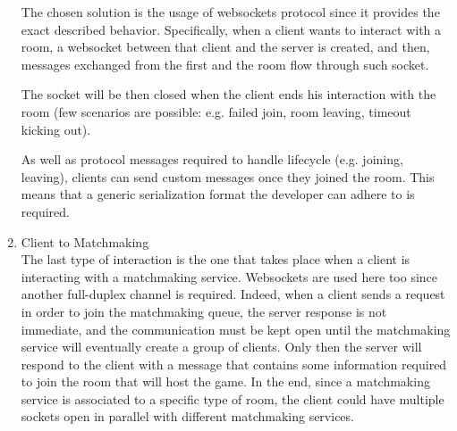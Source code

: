 \begin{enumerate}
	The chosen solution is the usage of websockets protocol since it provides the exact described behavior. Specifically, when a client wants to interact with a room, a websocket between that client and the server is created, and then, messages exchanged from the first and the room flow through such socket.
	
    The socket will be then closed when the client ends his interaction with the room (few scenarios are possible: e.g. failed join, room leaving, timeout kicking out).

 	As well as protocol messages required to handle lifecycle (e.g. joining, leaving),  clients can send custom messages once they joined the room. This means that a generic serialization format the developer can adhere to is required.
	
	
	\item Client to Matchmaking \\
	The last type of interaction is the one that takes place when a client is interacting with a matchmaking service. Websockets are used here too since another full-duplex channel is required. Indeed, when a client sends a request in order to join the matchmaking queue, the server response is not immediate, and the communication must be kept open until the matchmaking service will eventually create a group of clients. Only then the server will respond to the client with a message that contains some information required to join the room that will host the game.
	In the end, since a matchmaking service is associated to a specific type of room, the client could have multiple sockets open in parallel with different matchmaking services.
\end{enumerate}









